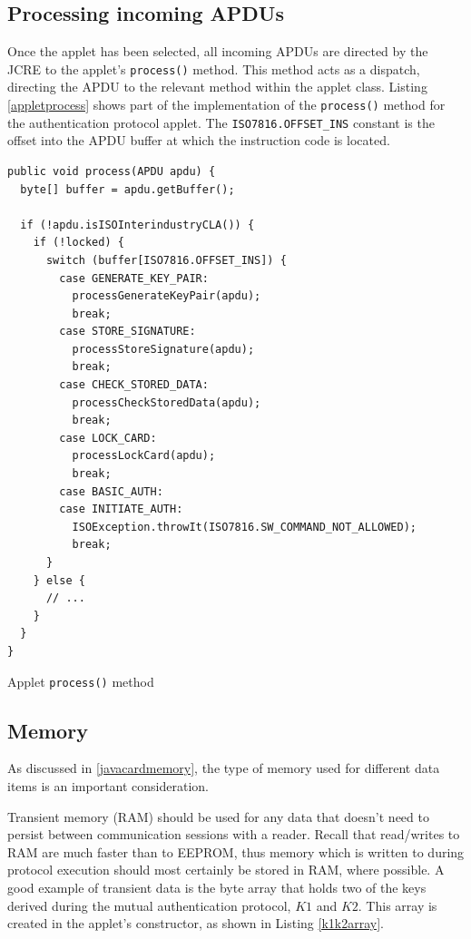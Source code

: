 \documentclass[12pt,a4paper,twoside,openright]{report}
\begin{document}
\subsection{Processing incoming APDUs}

Once the applet has been selected, all incoming APDUs are directed by the JCRE to the applet's \texttt{process()} method. This method acts as a dispatch, directing the APDU to the relevant method within the applet class. Listing \autoref{appletprocess} shows part of the implementation of the \texttt{process()} method for the authentication protocol applet. The \texttt{ISO7816.OFFSET\_INS} constant is the offset into the APDU buffer at which the instruction code is located.

\begin{listing}
\begin{verbatim}
public void process(APDU apdu) {
  byte[] buffer = apdu.getBuffer();

  if (!apdu.isISOInterindustryCLA()) {
    if (!locked) {
      switch (buffer[ISO7816.OFFSET_INS]) {
        case GENERATE_KEY_PAIR:
          processGenerateKeyPair(apdu);
          break;
        case STORE_SIGNATURE:
          processStoreSignature(apdu);
          break;
        case CHECK_STORED_DATA:
          processCheckStoredData(apdu);
          break;
        case LOCK_CARD:
          processLockCard(apdu);
          break;
        case BASIC_AUTH:
        case INITIATE_AUTH:
          ISOException.throwIt(ISO7816.SW_COMMAND_NOT_ALLOWED);
          break;
      }
    } else {
      // ...
    }
  }
}
\end{verbatim}
\caption{Applet \texttt{process()} method}
\label{appletprocess}
\end{listing}

\subsection{Memory}

As discussed in \autoref{javacardmemory}, the type of memory used for different data items is an important consideration.

Transient memory (RAM) should be used for any data that doesn't need to persist between communication sessions with a reader. Recall that read/writes to RAM are much faster than to EEPROM, thus memory which is written to during protocol execution should most certainly be stored in RAM, where possible. A good example of transient data is the byte array that holds two of the keys derived during the mutual authentication protocol, $K1$ and $K2$. This array is created in the applet's constructor, as shown in Listing \autoref{k1k2array}.
\end{document}
